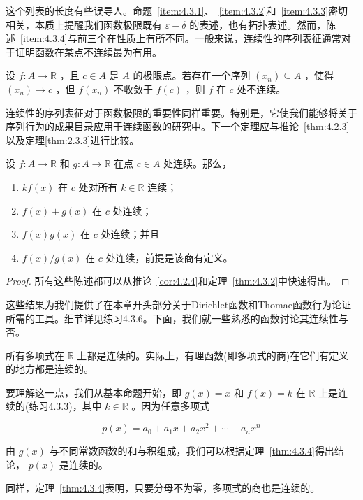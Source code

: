 这个列表的长度有些误导人。命题~\ref{item:4.3.1}、~\ref{item:4.3.2}和~\ref{item:4.3.3}密切相关，本质上提醒我们函数极限既有 \(\varepsilon  - \delta\) 的表述，也有拓扑表述。然而，陈述~\ref{item:4.3.4}与前三个在性质上有所不同。一般来说，连续性的序列表征通常对于证明函数在某点不连续最为有用。


\begin{Cor}[不连续性的判定准则]
  \label{cor:4.3.3}
  设 \(f : A \rightarrow  \mathbb{R}\) ，且 \(c \in  A\) 是 \(A\) 的极限点。若存在一个序列 \(\left( {x}_{n}\right)  \subseteq  A\) ，使得 \(\left( {x}_{n}\right)  \rightarrow  c\) ，但 \(f\left( {x}_{n}\right)\) 不收敛于 \(f\left( c\right)\) ，则 \(f\) 在 \(c\) 处不连续。
\end{Cor}


连续性的序列表征对于函数极限的重要性同样重要。特别是，它使我们能够将关于序列行为的成果目录应用于连续函数的研究中。下一个定理应与推论~\ref{thm:4.2.3}以及定理\ref{thm:2.3.3}进行比较。


\begin{Thm}[代数连续性定理]
  \label{thm:4.3.4}
  设 \(f : A \rightarrow  \mathbb{R}\) 和 \(g : A \rightarrow  \mathbb{R}\) 在点 \(c \in  A\) 处连续。那么，
\begin{enumerate}[label = (\roman*)]
\item \({kf}\left( x\right)\) 在 \(c\) 处对所有 \(k \in  \mathbb{R}\) 连续；
\item \(f\left( x\right)  + g\left( x\right)\) 在 \(c\) 处连续；
\item \(f\left( x\right) g\left( x\right)\) 在 \(c\) 处连续；并且
\item \(f\left( x\right) /g\left( x\right)\) 在 \(c\) 处连续，前提是该商有定义。
\end{enumerate}

\end{Thm}

\begin{proof}
  所有这些陈述都可以从推论~\ref{cor:4.2.4}和定理~\ref{thm:4.3.2}中快速得出。
\end{proof}

这些结果为我们提供了在本章开头部分关于Dirichlet函数和Thomae函数行为论证所需的工具。细节详见练习4.3.6。下面，我们就一些熟悉的函数讨论其连续性与否。


\begin{Eg}
  \label{eg:4.3.5}
  所有多项式在 \(\mathbb{R}\) 上都是连续的。实际上，有理函数(即多项式的商)在它们有定义的地方都是连续的。

  要理解这一点，我们从基本命题开始，即 \(g\left( x\right)  = x\) 和 \(f\left( x\right)  = k\) 在 \(\mathbb{R}\) 上是连续的(练习4.3.3)，其中 \(k \in  \mathbb{R}\) 。因为任意多项式

\[
p\left( x\right)  = {a}_{0} + {a}_{1}x + {a}_{2}{x}^{2} + \cdots  + {a}_{n}{x}^{n}
\]

由 \(g\left( x\right)\) 与不同常数函数的和与积组成，我们可以根据定理~\ref{thm:4.3.4}得出结论， \(p\left( x\right)\) 是连续的。

同样，定理~\ref{thm:4.3.4}表明，只要分母不为零，多项式的商也是连续的。
\end{Eg}



